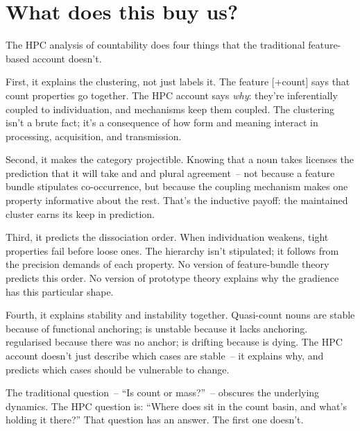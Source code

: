 \section{What does this buy us?}
\label{sec:9:payoff}

The HPC analysis of countability does four things that the traditional feature-based account doesn't.

First, it explains the clustering, not just labels it. The feature [+count] says that count properties go together. The HPC account says \emph{why}: they're inferentially coupled to individuation, and mechanisms keep them coupled. The clustering isn't a brute fact; it's a consequence of how form and meaning interact in processing, acquisition, and transmission.

Second, it makes the category projectible. Knowing that a noun takes  licenses the prediction that it will take  and  and plural agreement~-- not because a feature bundle stipulates co-occurrence, but because the coupling mechanism makes one property informative about the rest. That's the inductive payoff: the maintained cluster earns its keep in prediction.

Third, it predicts the dissociation order. When individuation weakens, tight properties fail before loose ones. The hierarchy isn't stipulated; it follows from the precision demands of each property. No version of feature-bundle theory predicts this order. No version of prototype theory explains why the gradience has this particular shape.

Fourth, it explains stability and instability together. Quasi-count nouns are stable because of functional anchoring;  is unstable because it lacks anchoring.  regularised because there was no anchor;  is drifting because  is dying. The HPC account doesn't just describe which cases are stable~-- it explains why, and predicts which cases should be vulnerable to change.

The traditional question~-- \enquote{Is  count or mass?}~-- obscures the underlying dynamics. The HPC question is: \enquote{Where does  sit in the count basin, and what's holding it there?} That question has an answer. The first one doesn't.

